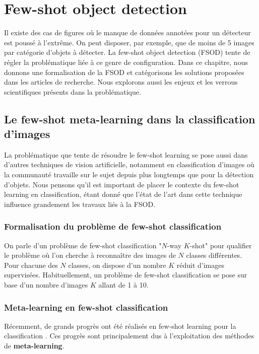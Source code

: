 \chapter{Few-shot object detection}
\label{chap:FSOD}
Il existe des cas de figures où le manque de données annotées pour un détecteur est poussé à l'extrême. On peut disposer, par exemple, que de moins de 5 images par catégorie d'objets à détecter. La few-shot object detection (FSOD) tente de régler la problématique liée à ce genre de configuration. Dans ce chapitre, nous donnons une formalisation de la FSOD et catégorisons les solutions proposées dans les articles de recherche. Nous explorons aussi les enjeux et les verrous scientifiques présents dans la problématique.


\section{Le few-shot meta-learning dans la classification d'images}
\label{sec:FSOD-FSL-meta}
La problématique que tente de résoudre le few-shot learning se pose aussi dans d'autres techniques de vision artificielle, notamment en classification d'images \cite{FSL-survey} où la communauté travaille sur le sujet depuis plus longtemps que pour la détection d'objets. Nous pensons qu'il est important de placer le contexte du few-shot learning en classification, étant donné que l'état de l'art dans cette technique influence grandement les travaux liés à la FSOD.

\subsection*{Formalisation du problème de few-shot classification}
On parle d'un problème de few-shot classification "$N$-way $K$-shot" pour qualifier le problème où l'on cherche à reconnaître des images de $N$ classes différentes. Pour chacune des $N$ classes, on dispose d'un nombre $K$ réduit d'images supervisées. Habituellement, un problème de few-shot classification se pose sur base d'un nombre d'images $K$ allant de 1 à 10.

\subsection*{Meta-learning en few-shot classification}
Récemment, de grands progrès ont été réalisés en few-shot learning pour la classification \cite{FSL-survey}. Ces progrès sont principalement dus à l'exploitation des méthodes de \textbf{meta-learning}.


